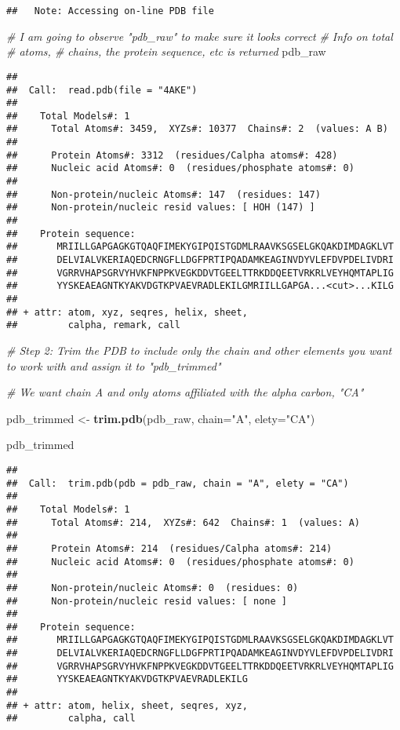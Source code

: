 \documentclass[]{article}
\newenvironment{Shaded}{\begin{snugshade}}{\end{snugshade}}
\newcommand{\KeywordTok}[1]{\textcolor[rgb]{0.13,0.29,0.53}{\textbf{{#1}}}}
\newcommand{\DataTypeTok}[1]{\textcolor[rgb]{0.13,0.29,0.53}{{#1}}}
\newcommand{\StringTok}[1]{\textcolor[rgb]{0.31,0.60,0.02}{{#1}}}
\newcommand{\CommentTok}[1]{\textcolor[rgb]{0.56,0.35,0.01}{\textit{{#1}}}}
\newcommand{\NormalTok}[1]{{#1}}
\begin{document}
\begin{verbatim}
##   Note: Accessing on-line PDB file
\end{verbatim}

\begin{Shaded}
\begin{Highlighting}[]
\CommentTok{# I am going to observe "pdb_raw" to make sure it looks correct}
\CommentTok{# Info on total # atoms, # chains, the protein sequence, etc is returned}
\NormalTok{pdb_raw}
\end{Highlighting}
\end{Shaded}

\begin{verbatim}
## 
##  Call:  read.pdb(file = "4AKE")
## 
##    Total Models#: 1
##      Total Atoms#: 3459,  XYZs#: 10377  Chains#: 2  (values: A B)
## 
##      Protein Atoms#: 3312  (residues/Calpha atoms#: 428)
##      Nucleic acid Atoms#: 0  (residues/phosphate atoms#: 0)
## 
##      Non-protein/nucleic Atoms#: 147  (residues: 147)
##      Non-protein/nucleic resid values: [ HOH (147) ]
## 
##    Protein sequence:
##       MRIILLGAPGAGKGTQAQFIMEKYGIPQISTGDMLRAAVKSGSELGKQAKDIMDAGKLVT
##       DELVIALVKERIAQEDCRNGFLLDGFPRTIPQADAMKEAGINVDYVLEFDVPDELIVDRI
##       VGRRVHAPSGRVYHVKFNPPKVEGKDDVTGEELTTRKDDQEETVRKRLVEYHQMTAPLIG
##       YYSKEAEAGNTKYAKVDGTKPVAEVRADLEKILGMRIILLGAPGA...<cut>...KILG
## 
## + attr: atom, xyz, seqres, helix, sheet,
##         calpha, remark, call
\end{verbatim}

\begin{Shaded}
\begin{Highlighting}[]
\CommentTok{# Step 2: Trim the PDB to include only the chain and other elements you want to work with and assign it to "pdb_trimmed"}

\CommentTok{# We want chain A and only atoms affiliated with the alpha carbon, "CA"}

\NormalTok{pdb_trimmed <-}\StringTok{ }\KeywordTok{trim.pdb}\NormalTok{(pdb_raw, }\DataTypeTok{chain=}\StringTok{"A"}\NormalTok{, }\DataTypeTok{elety=}\StringTok{"CA"}\NormalTok{)}

\NormalTok{pdb_trimmed}
\end{Highlighting}
\end{Shaded}

\begin{verbatim}
## 
##  Call:  trim.pdb(pdb = pdb_raw, chain = "A", elety = "CA")
## 
##    Total Models#: 1
##      Total Atoms#: 214,  XYZs#: 642  Chains#: 1  (values: A)
## 
##      Protein Atoms#: 214  (residues/Calpha atoms#: 214)
##      Nucleic acid Atoms#: 0  (residues/phosphate atoms#: 0)
## 
##      Non-protein/nucleic Atoms#: 0  (residues: 0)
##      Non-protein/nucleic resid values: [ none ]
## 
##    Protein sequence:
##       MRIILLGAPGAGKGTQAQFIMEKYGIPQISTGDMLRAAVKSGSELGKQAKDIMDAGKLVT
##       DELVIALVKERIAQEDCRNGFLLDGFPRTIPQADAMKEAGINVDYVLEFDVPDELIVDRI
##       VGRRVHAPSGRVYHVKFNPPKVEGKDDVTGEELTTRKDDQEETVRKRLVEYHQMTAPLIG
##       YYSKEAEAGNTKYAKVDGTKPVAEVRADLEKILG
## 
## + attr: atom, helix, sheet, seqres, xyz,
##         calpha, call
\end{verbatim}
\end{document}
